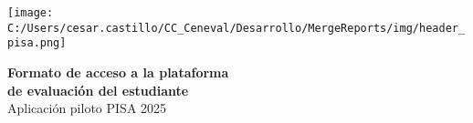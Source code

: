 \documentclass{letter}
\begin{document}

\begin{center}
    
\texttt{[image: C:/Users/cesar.castillo/CC\_Ceneval/Desarrollo/MergeReports/img/header\_pisa.png]}

\vspace{3\baselineskip}
\textbf{{\LARGE Formato de acceso a la plataforma}} \\
\textbf{{\LARGE de evaluación del estudiante}} \\
\vspace{.5\baselineskip}
{\LARGE Aplicación piloto PISA 2025}


\end{center}
\end{document}
